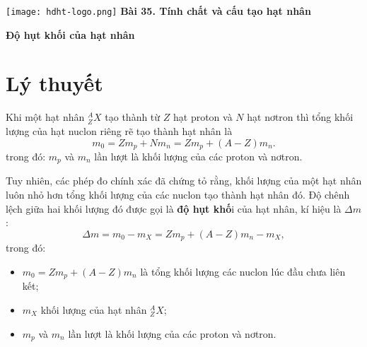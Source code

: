 \newcommand{\chapter}[2][]{
	\newcommand{\chapname}{#2}
	\begin{flushleft}
		\begin{minipage}[t]{\linewidth}
			\texttt{[image: hdht-logo.png]}
			\hspace{0pt}	
			\sffamily\bfseries\large Bài 35. Tính chất và cấu tạo hạt nhân
			\begin{flushleft}
				\huge\bfseries #1
			\end{flushleft}
		\end{minipage}
	\end{flushleft}
	\vspace{1cm}
	\normalfont\normalsize
}
\chapter[Độ hụt khối của hạt nhân]{Độ hụt khối của hạt nhân}
\section{Lý thuyết}
	
	Khi một hạt nhân $^A_Z X$ tạo thành từ $Z$ hạt proton và $N$ hạt nơtron thì tổng khối lượng của hạt nuclon riêng rẽ tạo thành hạt nhân là
	\begin{equation}
	m_0=Z m_p+N m_n=Z m_p+ (A-Z) m_n.
	\end{equation}
	trong đó: $m_p$ và $m_n$ lần lượt là khối lượng của các proton và nơtron.
	
	Tuy nhiên, các phép đo chính xác đã chứng tỏ rằng, khối lượng của một hạt nhân luôn nhỏ hơn tổng khối lượng của các nuclon tạo thành hạt nhân đó. Độ chênh lệch giữa hai khối lượng đó được gọi là \textbf{độ hụt khố}i của hạt nhân, kí hiệu là $\Delta m$:
	\begin{equation}
	\Delta m = m_0 - m_X = Z m_p+ (A-Z) m_n - m_X,
	\end{equation}
	trong đó:
	\begin{itemize}
		\item $m_0=Z m_p+ (A-Z) m_n$ là tổng khối lượng các nuclon lúc đầu chưa liên kết;
		\item $m_X$ khối lượng của hạt nhân $^A_Z X$;
		\item $m_p$ và $m_n$ lần lượt là khối lượng của các proton và nơtron.
	\end{itemize}

